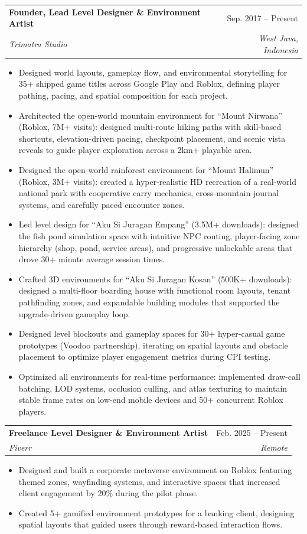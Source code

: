 \documentclass[letterpaper,11pt]{article}
\makeatletter
\newcommand{\resumeItem}[1]{
  \item\small{
    {#1 \vspace{-2pt}}
  }
}
\newcommand{\resumeSubheading}[4]{
  \vspace{-2pt}\item
    \begin{tabular*}{0.97\textwidth}[t]{l@{\extracolsep{\fill}}r}
      \textbf{#1} & #2 \\
      \textit{\small#3} & \textit{\small #4} \\
    \end{tabular*}\vspace{-7pt}
}
\newcommand{\resumeItemListStart}{\begin{itemize}}
\newcommand{\resumeItemListEnd}{\end{itemize}\vspace{-5pt}}
\makeatother
\begin{document}
    \resumeSubheading
      {Founder, Lead Level Designer \& Environment Artist}{Sep. 2017 -- Present}
      {Trimatra Studio}{West Java, Indonesia}
      \resumeItemListStart
        \resumeItem{Designed world layouts, gameplay flow, and environmental storytelling for 35+ shipped game titles across Google Play and Roblox, defining player pathing, pacing, and spatial composition for each project.}
        \resumeItem{Architected the open-world mountain environment for ``Mount Nirwana'' (Roblox, 7M+ visits): designed multi-route hiking paths with skill-based shortcuts, elevation-driven pacing, checkpoint placement, and scenic vista reveals to guide player exploration across a 2km+ playable area.}
        \resumeItem{Designed the open-world rainforest environment for ``Mount Halimun'' (Roblox, 3M+ visits): created a hyper-realistic HD recreation of a real-world national park with cooperative carry mechanics, cross-mountain journal systems, and carefully paced encounter zones.}
        \resumeItem{Led level design for ``Aku Si Juragan Empang'' (3.5M+ downloads): designed the fish pond simulation space with intuitive NPC routing, player-facing zone hierarchy (shop, pond, service areas), and progressive unlockable areas that drove 30+ minute average session times.}
        \resumeItem{Crafted 3D environments for ``Aku Si Juragan Kosan'' (500K+ downloads): designed a multi-floor boarding house with functional room layouts, tenant pathfinding zones, and expandable building modules that supported the upgrade-driven gameplay loop.}
        \resumeItem{Designed level blockouts and gameplay spaces for 30+ hyper-casual game prototypes (Voodoo partnership), iterating on spatial layouts and obstacle placement to optimize player engagement metrics during CPI testing.}
        \resumeItem{Optimized all environments for real-time performance: implemented draw-call batching, LOD systems, occlusion culling, and atlas texturing to maintain stable frame rates on low-end mobile devices and 50+ concurrent Roblox players.}
      \resumeItemListEnd

    \resumeSubheading
      {Freelance Level Designer \& Environment Artist}{Feb. 2025 -- Present}
      {Fiverr}{Remote}
      \resumeItemListStart
        \resumeItem{Designed and built a corporate metaverse environment on Roblox featuring themed zones, wayfinding systems, and interactive spaces that increased client engagement by 20\% during the pilot phase.}
        \resumeItem{Created 5+ gamified environment prototypes for a banking client, designing spatial layouts that guided users through reward-based interaction flows.}
      \resumeItemListEnd
\end{document}
